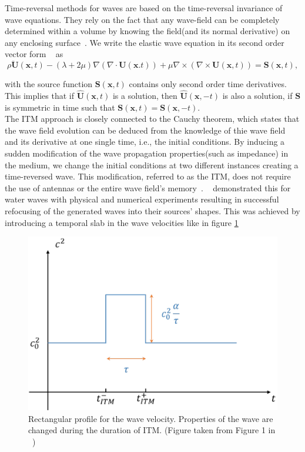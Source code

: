 Time-reversal methods for waves are based on the time-reversal invariance of wave equations. They rely on the fact that any wave-field can be completely determined within
a volume by knowing the field(and its normal derivative) on any enclosing surface~\parencite{Bacot2016}. We write the elastic wave equation in its second order vector form
~\parencite[Cha. 2]{aki2002quantitative} as
\begin{equation}
    \rho \ddot{\mathbf{U}} \left( \mathbf{x}, t\right) - \left( \lambda + 2 \mu \right) \nabla \left(\nabla \cdot \mathbf{U}\left(\mathbf{x}. t\right)\right) 
    + \mu \nabla \times \left(\nabla \times \mathbf{U}\left(\mathbf{x},t\right)\right) = \mathbf{S}\left(\mathbf{x},t\right),
\end{equation}

with the source function $\mathbf{S}\left(\mathbf{x},t\right)$ contains only second order time derivatives. This implies that if $\hat{\mathbf{U}}\left(\mathbf{x},t\right)$
is a solution, then $\hat{\mathbf{U}}\left(\mathbf{x}, -t\right)$ is also a solution, if $\mathbf{S}$ is symmetric in time such that 
$\mathbf{S}\left(\mathbf{x}, t\right) = \mathbf{S}\left(\mathbf{x}, -t\right)$. \\

The \ac{ITM} approach is closely connected to the Cauchy theorem, which states that the wave field evolution can be deduced from the knowledge of thie wave field
and its derivative at one single time, i.e., the initial conditions. By inducing a sudden modification of the wave propagation properties(such as impedance) in the
medium, we change the initial conditions at two different instances creating a time-reversed wave. This modification, referred to as the \ac{ITM}, does not require the use of antennas or the entire wave field's memory~\parencite{Bacot2016}.
~\parencite{Bacot2016} demonstrated this for water waves with physical and numerical experiments resulting in successful refocusing of the generated waves into their
sources' shapes. This was achieved by introducing a temporal slab in the wave velocities like in figure \ref{fig:deltavelocity}

\begin{figure}
    \centering
    \includegraphics[width=0.6\linewidth]{figures/delta_speed.png}
    \caption{Rectangular profile for the wave velocity. Properties of the wave are changed during the duration of \ac{ITM}. (Figure taken from Figure 1 in ~\parencite[Supplementary Material]{Bacot2016})}
    \label{fig:deltavelocity}
\end{figure}

